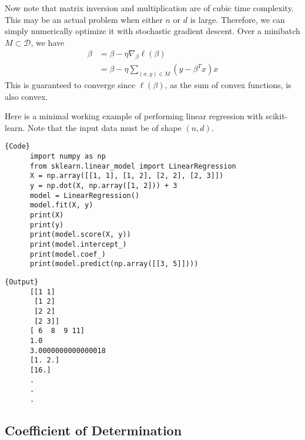   Now note that matrix inversion and multiplication are of cubic time complexity. This may be an actual problem when either $n$ or $d$ is large. Therefore, we can simply numerically optimize it with stochastic gradient descent. Over a minibatch $M \subset \mathcal{D}$, we have 
  \begin{align}
    \beta & = \beta - \eta \nabla_\beta \ell (\beta) \\
    & = \beta - \eta \sum_{(x, y) \in M} (y - \beta^T x) x
  \end{align}
  This is guaranteed to converge since $\ell(\beta)$, as the sum of convex functions, is also convex. 


  \begin{code}
    Here is a minimal working example of performing linear regression with scikit-learn. Note that the input data must be of shape $(n, d)$. 

    \noindent\begin{minipage}{.6\textwidth}
    \begin{lstlisting}[]{Code}
      import numpy as np 
      from sklearn.linear_model import LinearRegression 
      X = np.array([[1, 1], [1, 2], [2, 2], [2, 3]]) 
      y = np.dot(X, np.array([1, 2])) + 3 
      model = LinearRegression()  
      model.fit(X, y) 
      print(X) 
      print(y)
      print(model.score(X, y))  
      print(model.intercept_)
      print(model.coef_) 
      print(model.predict(np.array([[3, 5]])))
    \end{lstlisting}
    \end{minipage}
    \hfill
    \begin{minipage}{.39\textwidth}
    \begin{lstlisting}[]{Output}
      [[1 1]
       [1 2]
       [2 2]
       [2 3]]
      [ 6  8  9 11]
      1.0
      3.0000000000000018
      [1. 2.]
      [16.]
      .
      .
      .
    \end{lstlisting}
    \end{minipage}
  \end{code}

\subsection{Coefficient of Determination} 

